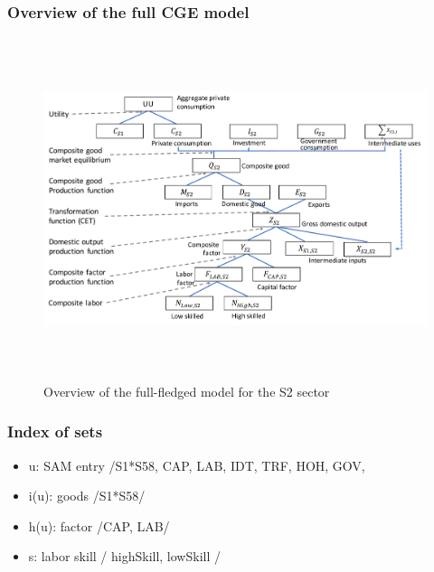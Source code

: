 \subsubsection{Overview of the full CGE model}

\begin{figure}[!h]
	\centering
	\includegraphics[height=10cm]{figures/overview_full.pdf}
	\caption{Overview of the full-fledged model for the S2 sector}
	\label{fig:overview_full}
\end{figure}

\subsubsection{Index of sets}
\begin{itemize}
	\item u: SAM entry     /S1*S58, CAP, LAB, IDT, TRF, HOH, GOV,
	\item i(u): goods         /S1*S58/
	\item h(u): factor        /CAP, LAB/
	\item s: labor skill   / highSkill, lowSkill /
\end{itemize}

